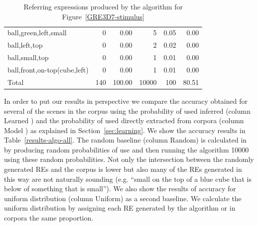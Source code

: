 \begin{table}[h!]
\begin{center}
\begin{tabular}{|l|r|r|r|r|r|}
ball,green,left,small                         &  0 &  0.00 &    5 &  0.05 &  0.00\\
ball,left,top                                 &  0 &  0.00 &    2 &  0.02 &  0.00\\
ball,small,top                                &  0 &  0.00 &    1 &  0.01 &  0.00\\
ball,front,on-top(cube,left)                  &  0 &  0.00 &    1 &  0.01 &  0.00\\
\hline
Total & 140 & 100.00 & 10000 & 100 & 80.51 \\
\hline
\end{tabular}
\caption{Referring expressions produced by the algorithm for Figure~\ref{GRE3D7-stimulus}\label{results-algo-fig3}}
\end{center}
\end{table}

In order to put our results in perspective we compare the accuracy obtained for several of the scenes in the corpus using the probability of used inferred (column Learned \puse) and the probability of used directly extracted from corpora (column Model \puse) as explained in Section~\ref{sec:learning}. We show the accuracy results in Table~\ref{results-algo-all}. The random baseline (column Random) is calculated in by producing random probabilities of use and then running the algorithm 10000 using these random probabilities. Not only the intersection between the randomly generated REs and the corpus is lower but also many of  the REs generated in this way are not naturally sounding (e.g. ``small on the top of a blue cube that is below of something that is small''). We also show the results of accuracy for uniform distribution (column Uniform) as a second baseline. We calculate the uniform distribution by assigning each RE generated by the algorithm or in corpora the same proportion. 

